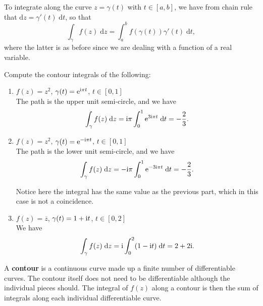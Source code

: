 \documentclass[letter-paper]{tufte-book}
\newenvironment{example}[1][Example]{\begin{trivlist}
\item[\hskip \labelsep {\bfseries #1}]}{\end{trivlist}}
\newcommand{\ex}{\mathrm{e}}
\newcommand{\zi}{{\rm i}}
\newcommand\Def[1]{\textbf{#1}}
\begin{document}
To integrate along the curve $z = \gamma(t)$ with $t\in[a, b]$, we have from
chain rule that $\mathrm{d}z = \gamma'(t)\; \mathrm{d}t$, so that
\begin{equation*}
  \int_{\gamma} f(z)\; \mathrm{d}z = \int^b_a f(\gamma(t)) \gamma'(t)\; \mathrm{d}t,
\end{equation*}
where the latter is as before since we are dealing with a function of a real
variable.

\begin{example}
  Compute the contour integrals of the following:
  \begin{enumerate}
    \item $f(z) = z^2$, $\gamma(t) = \ex^{\zi \pi t}$, $t \in [0, 1]$\\
    
    The path is the upper unit semi-circle, and we have
    \begin{equation*}
      \int_\gamma f(z)\; \mathrm{d}z = \zi \pi \int^1_0 \ex^{3\zi\pi t}\; \mathrm{d}t = -\frac{2}{3}.
    \end{equation*}
    
    \item $f(z) = z^2$, $\gamma(t) = \ex^{-\zi \pi t}$, $t \in [0, 1]$\\
    
    The path is the lower unit semi-circle, and we have
    \begin{equation*}
      \int_\gamma f(z)\; \mathrm{d}z = -\zi \pi \int^1_0 \ex^{-3\zi\pi t}\; \mathrm{d}t = -\frac{2}{3}.
    \end{equation*}
    
    Notice here the integral has the same value as the previous part, which in
    this case is not a coincidence.
    
    \item $f(z) = \overline{z}$, $\gamma(t) = 1 + \zi t$, $t \in [0, 2]$\\
    
    We have
    \begin{equation*}
      \int_\gamma f(z)\; \mathrm{d}z = \zi \int^2_0 (1 - \zi t)\; \mathrm{d}t = 2 + 2\zi.
    \end{equation*}
  \end{enumerate}
\end{example}

A \Def{contour} is a continuous curve made up a finite number of differentiable
curves. The contour itself does not need to be differentiable although the
individual pieces should. The integral of $f(z)$ along a contour is then the sum
of integrals along each individual differentiable curve.
\end{document}
